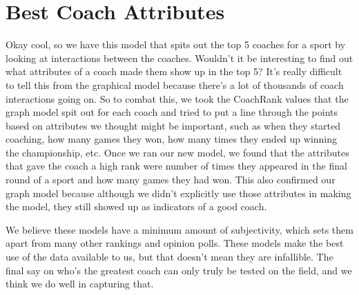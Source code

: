 \documentclass[12pt]{article}
\begin{document}
\section{Best Coach Attributes}
Okay cool, so we have this model that spits out the top 5 coaches for a sport by looking at interactions between the coaches. Wouldn't it be interesting to find out what attributes of a coach made them show up in the top 5? It's really difficult to tell this from the graphical model because there's a lot of thousands of coach interactions going on. So to combat this, we took the CoachRank values that the graph model spit out for each coach and tried to put a line through the points based on attributes we thought might be important, such as when they started coaching, how many games they won, how many times they ended up winning the championship, etc. Once we ran our new model, we found that the attributes that gave the coach a high rank were number of times they appeared in the final round of a sport and how many games they had won. This also confirmed our graph model because although we didn't explicitly use those attributes in making the model, they still showed up as indicators of a good coach. 

We believe these models have a minimum amount of subjectivity, which sets them apart from many other rankings and opinion polls. These models make the best use of the data available to us, but that doesn't mean they are infallible. The final say on who's the greatest coach can only truly be tested on the field, and we think we do well in capturing that.
\end{document}
